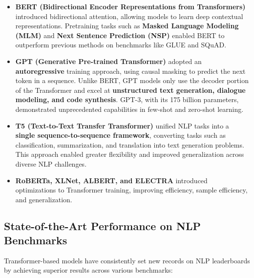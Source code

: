 \begin{itemize}
    \item \textbf{BERT (Bidirectional Encoder Representations from Transformers)} introduced bidirectional attention, allowing models to learn deep contextual representations. Pretraining tasks such as \textbf{Masked Language Modeling (MLM)} and \textbf{Next Sentence Prediction (NSP)} enabled BERT to outperform previous methods on benchmarks like GLUE and SQuAD.

    \item \textbf{GPT (Generative Pre-trained Transformer)} adopted an \textbf{autoregressive} training approach, using causal masking to predict the next token in a sequence. Unlike BERT, GPT models only use the decoder portion of the Transformer and excel at \textbf{unstructured text generation, dialogue modeling, and code synthesis}. GPT-3, with its 175 billion parameters, demonstrated unprecedented capabilities in few-shot and zero-shot learning.

    \item \textbf{T5 (Text-to-Text Transfer Transformer)} unified NLP tasks into a \textbf{single sequence-to-sequence framework}, converting tasks such as classification, summarization, and translation into text generation problems. This approach enabled greater flexibility and improved generalization across diverse NLP challenges.

    \item \textbf{RoBERTa, XLNet, ALBERT, and ELECTRA} introduced optimizations to Transformer training, improving efficiency, sample efficiency, and generalization.
\end{itemize}

\subsection{State-of-the-Art Performance on NLP Benchmarks}

Transformer-based models have consistently set new records on NLP leaderboards by achieving superior results across various benchmarks:

